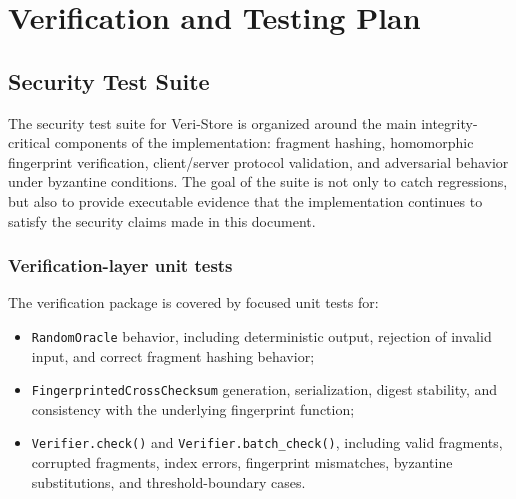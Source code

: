 \documentclass[../veristore_security_model.tex]{subfiles}
\begin{document}
\section{Verification and Testing Plan}


\subsection{Security Test Suite}

The security test suite for Veri-Store is organized around the main integrity-critical components of the implementation: fragment hashing, homomorphic fingerprint verification, client/server protocol validation, and adversarial behavior under byzantine conditions. The goal of the suite is not only to catch regressions, but also to provide executable evidence that the implementation continues to satisfy the security claims made in this document.

\subsubsection{Verification-layer unit tests}
The verification package is covered by focused unit tests for:
\begin{itemize}
    \item \texttt{RandomOracle} behavior, including deterministic output, rejection of invalid input, and correct fragment hashing behavior;
    \item \texttt{FingerprintedCrossChecksum} generation, serialization, digest stability, and consistency with the underlying fingerprint function;
    \item \texttt{Verifier.check()} and \texttt{Verifier.batch\_check()}, including valid fragments, corrupted fragments, index errors, fingerprint mismatches, byzantine substitutions, and threshold-boundary cases.
\end{itemize}
\end{document}
